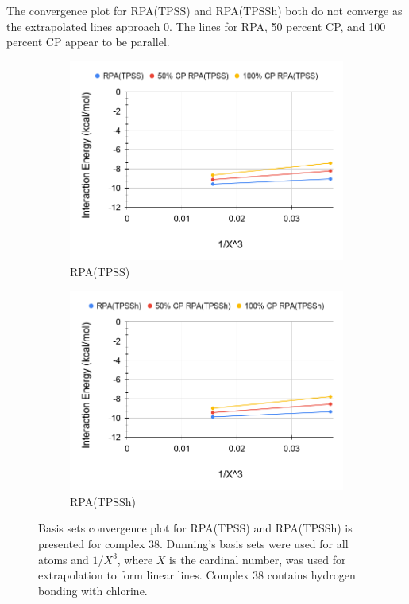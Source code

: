 \documentclass[11pt]{article}
\begin{document}
The convergence plot for RPA(TPSS) and RPA(TPSSh) both do not converge
as the extrapolated lines approach 0. The lines for RPA, 50 percent CP,
and 100 percent CP appear to be parallel.

\begin{figure}[H]
  \centering
  \begin{subfigure}{.5\textwidth}
    \centering
    \includegraphics[scale=0.3]{tpss-38.png}
    \caption{RPA(TPSS)}
    \label{fig:tpss_38}
  \end{subfigure}%
  \begin{subfigure}{.5\textwidth}
    \centering
    \includegraphics[scale=0.3]{tpssh-38.png}
    \caption{RPA(TPSSh)}
    \label{fig:tpssh_38}
  \end{subfigure}
  \caption{Basis sets convergence plot for RPA(TPSS) and RPA(TPSSh) is
    presented for complex 38. Dunning's basis sets were used for all
    atoms and $1/X^3$, where $X$ is the cardinal number, was used for
    extrapolation to form linear lines. Complex 38 contains hydrogen
    bonding with chlorine.}
  \label{fig:complex_38}
\end{figure}
\end{document}
